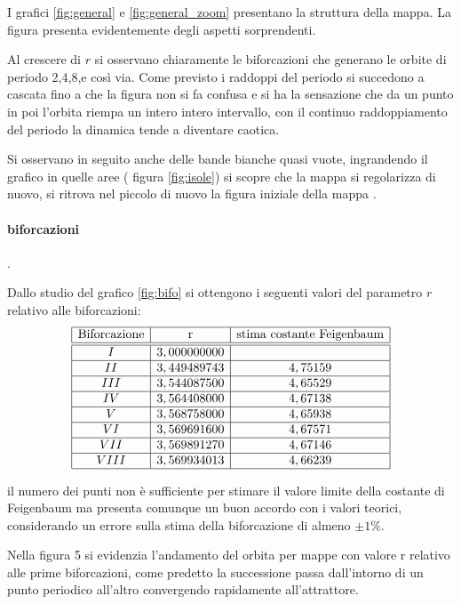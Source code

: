 \documentclass[13pt]{article}
\begin{document}
I grafici \ref{fig:general} e \ref{fig:general_zoom} presentano la struttura della mappa. La figura presenta evidentemente degli aspetti sorprendenti.

Al crescere di $r$ si osservano chiaramente le biforcazioni che generano le orbite di periodo 2,4,8,e così via.
Come previsto i raddoppi del periodo si succedono a cascata fino a che la figura non si fa confusa e si ha la sensazione che da un punto in poi l'orbita riempa un intero intero intervallo, con il continuo raddoppiamento del periodo la dinamica tende a diventare caotica.

Si osservano in seguito anche delle bande bianche quasi vuote, ingrandendo il grafico in quelle aree ( figura \ref{fig:isole}) si scopre che la mappa si regolarizza di nuovo, si ritrova nel piccolo di nuovo la figura iniziale della mappa .

\paragraph{\textbf{b}iforcazioni}.

Dallo studio del grafico \ref{fig:bifo} si ottengono i seguenti valori del parametro $r$ relativo alle biforcazioni:
\begin{displaymath}
\centering
\begin{array}{|c|c|c|}
\hline
\textrm{Biforcazione} & \textrm{r} & \textrm{stima costante Feigenbaum} \\
\hline
\hline
I	 & 	3,000000000	 & 	\\
\hline
II	 & 	3,449489743	 & 	4,75159 \\
\hline
III	 & 	3,544087500	 & 	4,65529 \\
\hline
IV	 & 	3,564408000	 & 	4,67138 \\
\hline
V	 & 	3,568758000	 & 	4,65938 \\
\hline
VI	 & 	3,569691600	 & 	4,67571 \\
\hline
VII	 & 	3,569891270	 & 	4,67146 \\
\hline
VIII	 & 	3,569934013	 & 	4,66239 \\
\hline
\end{array}
\end{displaymath}

il numero dei punti non è sufficiente per stimare il valore limite della costante di Feigenbaum ma presenta comunque un buon accordo con i valori teorici, considerando un errore sulla stima della biforcazione di almeno $\pm 1\%$.

Nella figura 5 si evidenzia l'andamento del orbita per mappe con valore r relativo alle prime biforcazioni, come predetto la successione passa dall'intorno di un punto periodico all'altro convergendo rapidamente all'attrattore.
\end{document}
